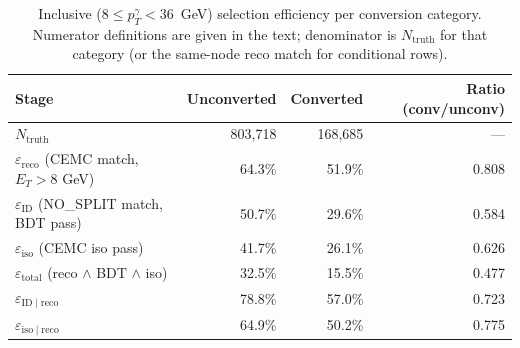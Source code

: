 \documentclass[11pt,a4paper]{article}
\begin{document}
\begin{table}[H]
\centering
\caption{Inclusive ($8 \le p_T^{\gamma}<36$~GeV) selection efficiency per
conversion category. Numerator definitions are given in the text;
denominator is $N_{\mathrm{truth}}$ for that category (or the
same-node reco match for conditional rows).
}
\label{tab:eff_inclusive}
\begin{tabular}{lrrr}
\toprule
Stage & Unconverted & Converted & Ratio (conv/unconv) \\
\midrule
$N_{\mathrm{truth}}$                                     & 803,718 & 168,685 & --- \\
$\varepsilon_{\mathrm{reco}}$ (CEMC match, $E_T>8$ GeV)  & 64.3\% & 51.9\% & 0.808 \\
$\varepsilon_{\mathrm{ID}}$ (NO\_SPLIT match, BDT pass)  & 50.7\% & 29.6\% & 0.584 \\
$\varepsilon_{\mathrm{iso}}$ (CEMC iso pass)             & 41.7\% & 26.1\% & 0.626 \\
$\varepsilon_{\mathrm{total}}$ (reco $\wedge$ BDT $\wedge$ iso) & 32.5\% & 15.5\% & 0.477 \\
$\varepsilon_{\mathrm{ID}\mid\mathrm{reco}}$             & 78.8\% & 57.0\% & 0.723 \\
$\varepsilon_{\mathrm{iso}\mid\mathrm{reco}}$            & 64.9\% & 50.2\% & 0.775 \\
\bottomrule
\end{tabular}
\end{table}
\end{document}
